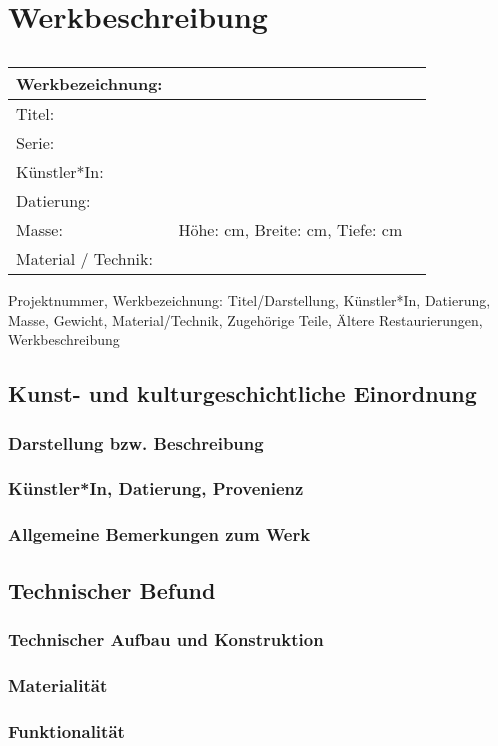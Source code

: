 
\chapter{Werkbeschreibung}

\begin{table}[hbt]
  \begin{tabular}{l|cc}
    Werkbezeichnung: &  \\
    \hline
    Titel: & & \\
    \hline
    Serie: & \\
    \hline
    Künstler*In: & \\
    \hline
    Datierung: & \\
    \hline
    Masse: & Höhe: cm, Breite: cm, Tiefe: cm \\
    \hline
    Material / Technik: & \\
   
  \end{tabular}
  \caption{}
\end{table}


Projektnummer, Werkbezeichnung: Titel/Darstellung, Künstler*In, Datierung, Masse, Gewicht, Material/Technik, Zugehörige Teile, Ältere Restaurierungen, Werkbeschreibung 

\section{Kunst- und kulturgeschichtliche Einordnung}
\subsection{Darstellung bzw. Beschreibung}
\subsection{Künstler*In, Datierung, Provenienz}
\subsection{Allgemeine Bemerkungen zum Werk}

\section{Technischer Befund}
\subsection{Technischer Aufbau und Konstruktion}
\subsection{Materialität}
\subsection{Funktionalität}






